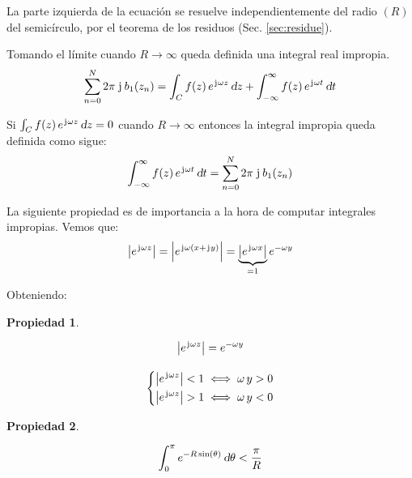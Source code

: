 \documentclass[a5paper,12pt,twoside]{book}
\newtheorem{prop}{{Propiedad}}[chapter]
\begin{document}
La parte izquierda de la ecuación se resuelve independientemente del radio $(R)$ del semicírculo, por el teorema de los residuos (Sec. \ref{sec:residue}).

Tomando el límite cuando $R\to\infty$ queda definida una integral real impropia.
\begin{equation*}
    \sum_{n=0}^N 2 \pi \, \mkern2mu\mathrm{j}\mkern1mu \, b_1(z_n) = \int_C f(z) \, e^{\mkern2mu\mathrm{j}\mkern1mu \omega z} \, \textsl{d} z + \int_{-\infty}^{\infty} f(z) \, e^{\mkern2mu\mathrm{j}\mkern1mu \omega t} \, \textsl{d} t
\end{equation*}

Si $\int_C f(z) \, e^{\mkern2mu\mathrm{j}\mkern1mu \omega z} \, \textsl{d} z = 0$ cuando $R \to \infty$ entonces la integral impropia queda definida como sigue:
\begin{equation*}
    \int_{-\infty}^{\infty} f(z) \, e^{\mkern2mu\mathrm{j}\mkern1mu \omega t} \, \textsl{d} t = \sum_{n=0}^N 2 \pi \, \mkern2mu\mathrm{j}\mkern1mu \, b_1(z_n)
\end{equation*}

La siguiente propiedad es de importancia a la hora de computar integrales impropias.
Vemos que:
\begin{equation*}
    {\left| {e^{\mkern2mu\mathrm{j}\mkern1mu\omega z}} \right|} = {\left| {e^{\mkern2mu\mathrm{j}\mkern1mu \omega \left(x + \mkern2mu\mathrm{j}\mkern1mu y\right)}} \right|} = \underbrace{{\left| {e^{\mkern2mu\mathrm{j}\mkern1mu \omega x}} \right|}}_{=1} e^{-\omega y}
\end{equation*}

Obteniendo:

\begin{mdframed}[style=PropertyFrame]
    \begin{prop}
    \end{prop}
    \begin{gather*}
        {\left| {e^{\mkern2mu\mathrm{j}\mkern1mu\omega z}} \right|} = e^{-\omega y}
        \\[1em]
        \left\{
        \begin{aligned}
            {\left| {e^{\mkern2mu\mathrm{j}\mkern1mu\omega z}} \right|} &< 1 \iff \omega \, y > 0
            \\
            {\left| {e^{\mkern2mu\mathrm{j}\mkern1mu \omega z}} \right|} &> 1 \iff \omega \, y < 0
        \end{aligned}
        \right.
    \end{gather*}
\end{mdframed}

\begin{mdframed}[style=PropertyFrame]
    \begin{prop}
    \end{prop}
    \begin{equation*}
        \int_0^\pi e^{-R \sin(\theta)} \, \textsl{d} \theta < \frac{\pi}{R}
    \end{equation*}
\end{mdframed}
\end{document}
